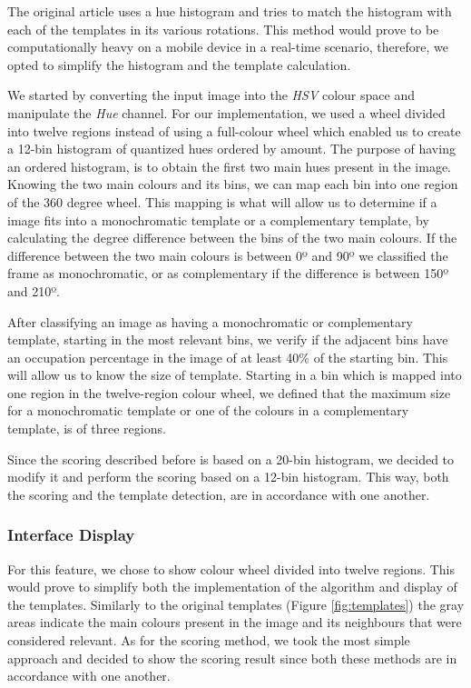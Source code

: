 The original article uses a hue histogram and tries to match the histogram with each of the templates in its various rotations. This method would prove to be computationally heavy on a mobile device in a real-time scenario, therefore, we opted to simplify the histogram and the template calculation. 

We started by converting the input image into the \emph{HSV} colour space and manipulate the \emph{Hue} channel. For our implementation, we used a wheel divided into twelve regions instead of using a full-colour wheel which enabled us to create a 12-bin histogram of quantized hues ordered by amount. The purpose of having an ordered histogram, is to obtain the first two main hues present in the image. Knowing the two main colours and its bins, we can map each bin into one region of the 360 degree wheel. This mapping is what will allow us to determine if a image fits into a monochromatic template or a complementary template, by calculating the degree difference between the bins of the two main colours. If the difference between the two main colours is between 0º and 90º we classified the frame as monochromatic, or as complementary if the difference is between 150º and 210º.

After classifying an image as having a monochromatic or complementary template, starting in the most relevant bins, we verify if the adjacent bins have an occupation percentage in the image of at least 40\% of the starting bin. This will allow us to know the size of template. Starting in a bin which is mapped into one region in the twelve-region colour wheel, we defined that the maximum size for a monochromatic template or one of the colours in a complementary template, is of three regions.


Since the scoring described before is based on a 20-bin histogram, we decided to modify it and perform the scoring based on a 12-bin histogram. This way, both the scoring and the template detection, are in accordance with one another.

\subsubsection{Interface Display}

For this feature, we chose to show colour wheel divided into twelve regions. This would prove to simplify both the implementation of the algorithm and display of the templates. Similarly to the original templates (Figure \ref{fig:templates}) the gray areas indicate the main colours present in the image and its neighbours that were considered relevant.
As for the scoring method, we took the most simple approach and decided to show the scoring result since both these methods are in accordance with one another.

